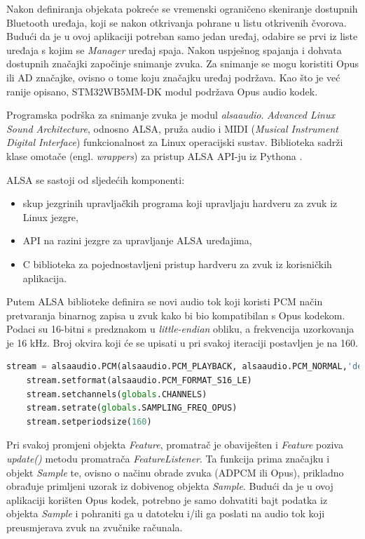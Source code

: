 Nakon definiranja objekata pokreće se vremenski ograničeno skeniranje dostupnih Bluetooth uređaja, koji se nakon otkrivanja pohrane u listu otkrivenih čvorova. Budući da je u ovoj aplikaciji potreban samo jedan uređaj, odabire se prvi iz liste uređaja s kojim se \textit{Manager} uređaj spaja. Nakon uspješnog spajanja i dohvata dostupnih značajki započinje snimanje zvuka. Za snimanje se mogu koristiti Opus ili AD značajke, ovisno o tome koju značajku uređaj podržava. Kao što je već ranije opisano, STM32WB5MM-DK modul podržava Opus audio kodek.

Programska podrška za snimanje zvuka je modul \textit{alsaaudio}. \textit{Advanced Linux Sound Architecture}, odnosno ALSA, pruža audio i MIDI (\textit{Musical Instrument Digital Interface}) funkcionalnost za Linux operacijski sustav. Biblioteka sadrži klase omotače (engl. \textit{wrappers}) za pristup ALSA API-ju iz Pythona \cite{alsaaudio}. 

ALSA se sastoji od sljedećih komponenti:
\begin{itemize}
	\item skup jezgrinih upravljačkih programa koji upravljaju hardveru za zvuk iz Linux jezgre,
	\item API na razini jezgre za upravljanje ALSA uređajima, 
	\item C biblioteka za pojednostavljeni pristup hardveru za zvuk iz korisničkih aplikacija. 
\end{itemize}

Putem ALSA biblioteke definira se novi audio tok koji koristi PCM način pretvaranja binarnog zapisa u zvuk kako bi bio kompatibilan s Opus kodekom. Podaci su 16-bitni s predznakom u \textit{little-endian} obliku, a frekvencija uzorkovanja je 16 kHz. Broj okvira koji će se upisati u pri svakoj iteraciji postavljen je na 160. 

\begin{lstlisting}[language=Python, caption={Postavljanje parametara za dekodiranje audio signala}]
	stream = alsaaudio.PCM(alsaaudio.PCM_PLAYBACK, alsaaudio.PCM_NORMAL,'default')
	stream.setformat(alsaaudio.PCM_FORMAT_S16_LE)
	stream.setchannels(globals.CHANNELS)
	stream.setrate(globals.SAMPLING_FREQ_OPUS)
	stream.setperiodsize(160)
\end{lstlisting}

Pri svakoj promjeni objekta \textit{Feature}, promatrač je obaviješten i \textit{Feature} poziva \textit{update()} metodu promatrača \textit{FeatureListener}. Ta funkcija prima značajku i objekt \textit{Sample} te, ovisno o načinu obrade zvuka (ADPCM ili Opus), prikladno obrađuje primljeni uzorak iz dobivenog objekta \textit{Sample}. Budući da je u ovoj aplikaciji korišten Opus kodek, potrebno je samo dohvatiti bajt podatka iz objekta \textit{Sample} i pohraniti ga u datoteku i/ili ga poslati na audio tok koji preusmjerava zvuk na zvučnike računala. 

